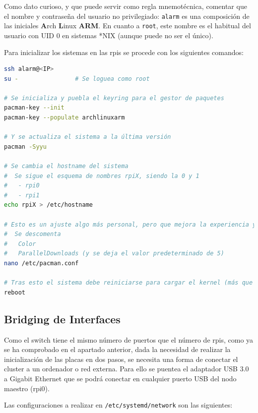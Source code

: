 Como dato curioso, y que puede servir como regla mnemotécnica, comentar que el nombre y contraseña del usuario no privilegiado: \texttt{alarm} es una composición de las iniciales \textbf{A}rch \textbf{L}inux \textbf{ARM}. En cuanto a \texttt{root}, este nombre es el habitual del usuario con UID 0 en sistemas *NIX (aunque puede no ser el único).

Para inicializar los sistemas en las \acrshort{rpi}s se procede con los siguientes comandos:

\begin{lstlisting}[language=bash]
ssh alarm@<IP>
su -                # Se loguea como root

# Se inicializa y puebla el keyring para el gestor de paquetes
pacman-key --init
pacman-key --populate archlinuxarm

# Y se actualiza el sistema a la última versión
pacman -Syyu

# Se cambia el hostname del sistema
#  Se sigue el esquema de nombres rpiX, siendo la 0 y 1
#   - rpi0
#   - rpi1
echo rpiX > /etc/hostname

# Esto es un ajuste algo más personal, pero que mejora la experiencia y velocidad en las actualizaciones: se edita el archivo /etc/pacman.conf
#  Se descomenta
#   Color
#   ParallelDownloads (y se deja el valor predeterminado de 5)
nano /etc/pacman.conf

# Tras esto el sistema debe reiniciarse para cargar el kernel (más que probablemente) actualizado. Tras el arranque se debe verificar que todo funcione correctamente.
reboot
\end{lstlisting}

\subsection{Bridging de Interfaces}
Como el switch tiene el mismo número de puertos que el número de \acrshort{rpi}s, como ya se ha comprobado en el apartado anterior, dada la necesidad de realizar la inicialización de las placas en dos pasos, se necesita una forma de conectar el cluster a un ordenador o red externa. Para ello se puentea el adaptador USB 3.0 a Gigabit Ethernet que se podrá conectar en cualquier puerto USB del nodo maestro (rpi0).

Las configuraciones a realizar en \texttt{/etc/systemd/network} son las siguientes:

